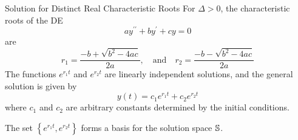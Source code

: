 \documentclass{beamer}
\begin{document}
\begin{frame}
\begin{block}{Solution for Distinct Real Characteristic Roots}
For $\Delta>0$, the characteristic roots of the DE
\begin{equation*}
ay^{\prime\prime}+by^{\prime}+cy=0
\end{equation*}
are
\begin{equation*}
r_1=\dfrac{-b+\sqrt{b^2-4ac}}{2a}
,\quad\text{and}\quad
r_2=\dfrac{-b-\sqrt{b^2-4ac}}{2a}
\end{equation*}\pause
The functions $e^{r_1t}$ and $e^{r_2t}$ are linearly independent solutions, and the general solution is given by
\begin{equation*}
y(t)=c_1e^{r_1t}+c_2e^{r_2t}
\end{equation*}
where $c_1$ and $c_2$ are arbitrary constants determined by the initial conditions.\pause

\vspace{2mm}
The set $\left\{e^{r_1t},e^{r_2t}\right\}$ forms a basis for the solution space $\mathbb{S}$.
\end{block}
\end{frame}
\end{document}
